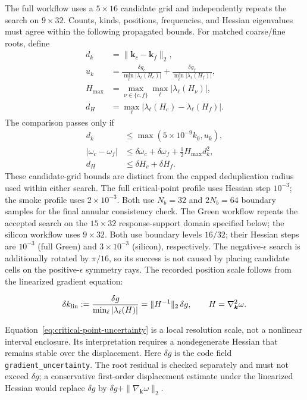 The full workflow uses a \(5\times16\) candidate grid and independently
repeats the search on \(9\times32\).  Counts, kinds, positions, frequencies,
and Hessian eigenvalues must agree within the following propagated bounds.
For matched coarse/fine roots, define
\[
 \begin{aligned}
 d_k&=\|\boldsymbol k_c-\boldsymbol k_f\|_2,\\
 u_k&=\frac{\delta g_c}{\min_\ell|\lambda_\ell(H_c)|}
     +\frac{\delta g_f}{\min_\ell|\lambda_\ell(H_f)|},\\
 H_{\max}&=\max_{\nu\in\{c,f\}}\max_\ell|\lambda_\ell(H_\nu)|,\\
 d_H&=\max_\ell|\lambda_\ell(H_c)-\lambda_\ell(H_f)|.
 \end{aligned}
\]
The comparison passes only if
\[
 \begin{aligned}
 d_k&\leq\max(5\times10^{-9}k_0,u_k),\\
 |\omega_c-\omega_f|
 &\leq\delta\omega_c+\delta\omega_f
       +\tfrac12 H_{\max}d_k^2,\\
 d_H&\leq\delta H_c+\delta H_f.
 \end{aligned}
\]
These candidate-grid bounds are distinct from the capped deduplication radius
used within either search.  The
full critical-point profile uses Hessian step \(10^{-3}\); the smoke profile
uses \(2\times10^{-3}\).  Both use \(N_b=32\) and \(2N_b=64\) boundary
samples for the final annular consistency check.  The Green workflow repeats
the accepted search on the \(15\times32\) response-support domain specified
below; the silicon workflow uses \(9\times32\).  Both use boundary levels
\(16/32\); their Hessian steps are \(10^{-3}\) (full Green) and
\(3\times10^{-3}\) (silicon), respectively.  The
negative-\(\epsilon\) search is additionally rotated by \(\pi/16\), so its
success is not caused by placing candidate cells on the positive-\(\epsilon\)
symmetry rays.  The recorded position scale follows from the linearized
gradient equation:

\begin{equation}
 \delta k_{\rm lin}:=
 \frac{\delta g}{\min_\ell|\lambda_\ell(H)|}
 =\|H^{-1}\|_2\,\delta g,
 \qquad H=\nabla_{\boldsymbol k}^2\omega .
 \label{eq:critical-point-uncertainty}
\end{equation}

Equation~\eqref{eq:critical-point-uncertainty} is a local resolution scale,
not a nonlinear interval enclosure.  Its interpretation requires a
nondegenerate Hessian that remains stable over the displacement.  Here
\(\delta g\) is the code field \texttt{gradient\_uncertainty}.  The root
residual is checked separately and must not exceed \(\delta g\); a
conservative first-order displacement estimate under the linearized Hessian
would replace \(\delta g\) by
\(\delta g+\|\nabla_{\boldsymbol k}\omega\|_2\).

